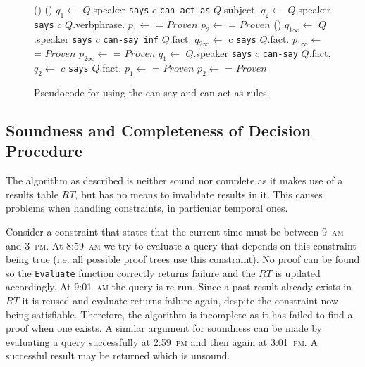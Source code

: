 \documentclass[thesis.tex]{subfiles}
\begin{document}
\begin{figure}\footnotesize\sffamily\centering
  \begin{algorithm}[H]
    \Fn(){}{
    }
   \; 
    \Fn(){}{
      $q_1 \gets$ $Q$.speaker \texttt{says} $c$ \texttt{can-act-as} $Q$.subject.\; 
      $q_2 \gets$ $Q$.speaker \texttt{says} $c$ $Q$.verbphrase.\;
      $p_1 \gets$  = $Proven$\;
      $p_2 \gets$  = $Proven$\;
    }
   \; 
    \Fn(){}{
      $q_{1\infty} \gets$ $Q$.speaker \texttt{says} $c$ \texttt{can-say inf} $Q$.fact.\; 
      $q_{2\infty} \gets$ c \texttt{says} $Q$.fact.\;
      $p_{1\infty} \gets$  = $Proven$\;
      $p_{2\infty} \gets$  = $Proven$\;
      $q_1 \gets$ $Q$.speaker \texttt{says} $c$ \texttt{can-say} $Q$.fact.\; 
      $q_2 \gets$ $c$ \texttt{says} $Q$.fact.\;
      $p_1 \gets$  = $Proven$\;
      $p_2 \gets$  = $Proven$\;
    }
  \end{algorithm}
  \caption{Pseudocode for using the can-say and can-act-as rules.}
  \label{alg:eval2}
\end{figure}

\subsection{Soundness and Completeness of Decision Procedure}

The algorithm as described is neither sound nor complete as it makes
use of a results table $RT$, but has no means to invalidate results in
it. This causes problems when handling constraints, in particular
temporal ones.

Consider a constraint that states that the current time must be between
9~\textsc{am} and 3~\textsc{pm}. At 8:59~\textsc{am} we try to evaluate a query
that depends on this constraint being true (i.e. all possible proof trees use
this constraint). No proof can be found so the \texttt{Evaluate} function
correctly returns failure and the $RT$ is updated accordingly. At
9:01~\textsc{am} the query is re-run. Since a past result already exists in $RT$
it is reused and evaluate returns failure again, despite the constraint now
being satisfiable. Therefore, the algorithm is incomplete as it has failed to
find a proof when one exists. A similar argument for soundness can be made by
evaluating a query successfully at 2:59~\textsc{pm} and then again at
3:01~\textsc{pm}. A successful result may be returned which is unsound.
\end{document}
